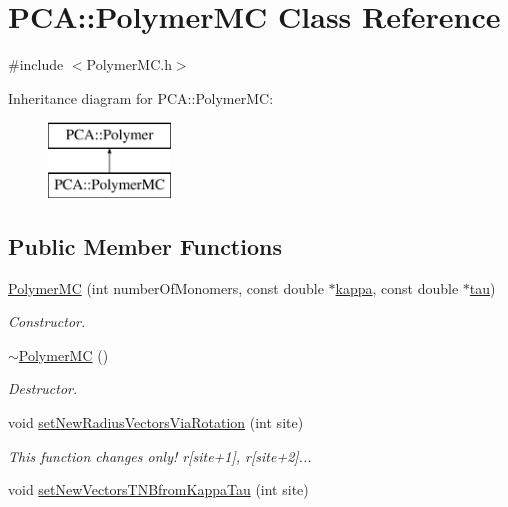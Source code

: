 \hypertarget{class_p_c_a_1_1_polymer_m_c}{}\section{P\+CA\+:\+:Polymer\+MC Class Reference}
\label{class_p_c_a_1_1_polymer_m_c}


{\ttfamily \#include $<$Polymer\+M\+C.\+h$>$}

Inheritance diagram for P\+CA\+:\+:Polymer\+MC\+:\begin{figure}[H]
\begin{center}
\leavevmode
\includegraphics[height=2.000000cm]{class_p_c_a_1_1_polymer_m_c}
\end{center}
\end{figure}
\subsection*{Public Member Functions}
\begin{DoxyCompactItemize}
\item 
\hyperlink{class_p_c_a_1_1_polymer_m_c_a3a792caa4db0fe8a7c749c4b0f6fce25}{Polymer\+MC} (int number\+Of\+Monomers, const double $\ast$\hyperlink{class_p_c_a_1_1_polymer_a1bef29f1613bb4b67981aae7df3d804b}{kappa}, const double $\ast$\hyperlink{class_p_c_a_1_1_polymer_ab3b07298bdbac01a7b20b2554d7b248f}{tau})
\begin{DoxyCompactList}\small\item\em Constructor. \end{DoxyCompactList}\item 
\hyperlink{class_p_c_a_1_1_polymer_m_c_a6ed770992221cd0a7a9e364d4d5fcda3}{$\sim$\+Polymer\+MC} ()
\begin{DoxyCompactList}\small\item\em Destructor. \end{DoxyCompactList}\item 
void \hyperlink{class_p_c_a_1_1_polymer_m_c_a80c92a94292d085a0d0ce0563ae0a1fd}{set\+New\+Radius\+Vectors\+Via\+Rotation} (int site)
\begin{DoxyCompactList}\small\item\em This function changes only! r\mbox{[}site+1\mbox{]}, r\mbox{[}site+2\mbox{]}... \end{DoxyCompactList}\item 
void \hyperlink{class_p_c_a_1_1_polymer_m_c_ab7ec6ffe521bf27c218f4a6eac6c394b}{set\+New\+Vectors\+T\+N\+Bfrom\+Kappa\+Tau} (int site)
\end{DoxyCompactItemize}
